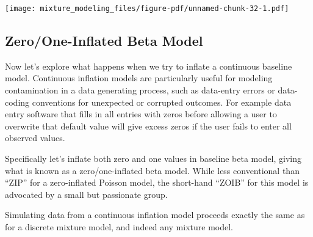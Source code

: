 \documentclass[
  letterpaper,
  DIV=11,
  numbers=noendperiod]{scrartcl}
\begin{document}
\texttt{[image: mixture\_modeling\_files/figure-pdf/unnamed-chunk-32-1.pdf]}

\subsection{Zero/One-Inflated Beta
Model}\label{zeroone-inflated-beta-model}

Now let's explore what happens when we try to inflate a continuous
baseline model. Continuous inflation models are particularly useful for
modeling contamination in a data generating process, such as data-entry
errors or data-coding conventions for unexpected or corrupted outcomes.
For example data entry software that fills in all entries with zeros
before allowing a user to overwrite that default value will give excess
zeros if the user fails to enter all observed values.

Specifically let's inflate both zero and one values in baseline beta
model, giving what is known as a zero/one-inflated beta model. While
less conventional than ``ZIP'' for a zero-inflated Poisson model, the
short-hand ``ZOIB'' for this model is advocated by a small but
passionate group.

Simulating data from a continuous inflation model proceeds exactly the
same as for a discrete mixture model, and indeed any mixture model.
\end{document}
